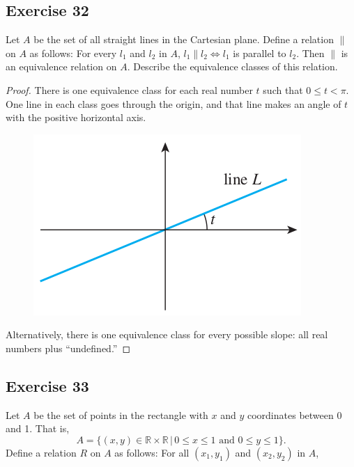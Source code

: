 \documentclass[14pt]{extarticle}
\newcommand{\R}{\mathbb{R}}
\begin{document}
\subsection{Exercise 32}
Let $A$ be the set of all straight lines in the Cartesian plane. Define a relation \(\parallel\) on $A$ as follows:
For every $l_1$ and $l_2$ in $A$, \(l_1 \parallel l_2 \iff l_1\) is parallel to $l_2$. Then \(\parallel\) is an
equivalence relation on $A$. Describe the equivalence classes of this relation.

\begin{proof}
        There is one equivalence class for each real number $t$ such that \(0 \leq t < \pi\). One line in each class goes
        through the origin, and that line makes an angle of $t$ with the positive horizontal axis.

        \begin{figure}[ht!]
                \centering
                \includegraphics[scale=0.5]{../images/8.3.32.png}
        \end{figure}

        Alternatively, there is one equivalence class for every
        possible slope: all real numbers plus “undefined.”
\end{proof}

\subsection{Exercise 33}
Let $A$ be the set of points in the rectangle with $x$ and $y$ coordinates between 0 and 1. That is,
\[A = \{(x, y) \in \R \times \R \,|\, 0 \leq x \leq 1 \text{ and } 0 \leq y \leq 1\}.
\]
Define a relation $R$ on $A$ as follows: For all \((x_1, y_1)\) and \((x_2, y_2)\) in $A$,
\end{document}
